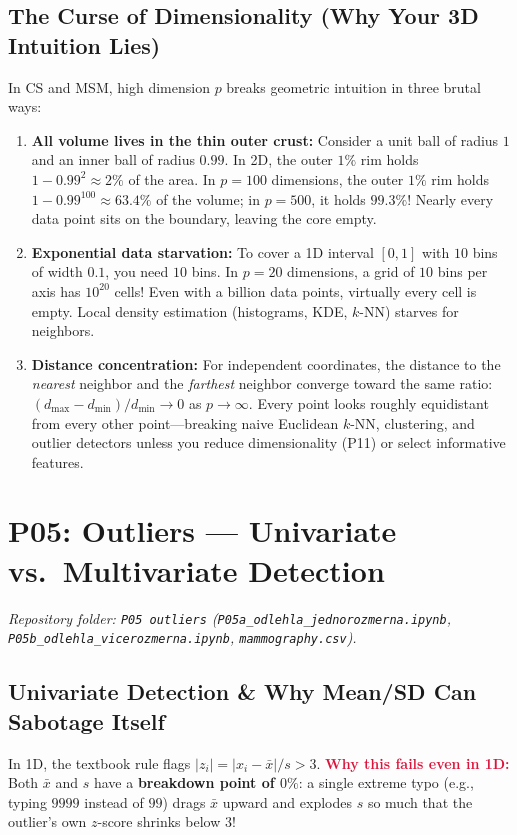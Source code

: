 \documentclass[11pt, a4paper]{article}
\begin{document}
\subsection{The Curse of Dimensionality (Why Your 3D Intuition Lies)}
In CS and MSM, high dimension $p$ breaks geometric intuition in three brutal ways:
\begin{enumerate}
    \item \textbf{All volume lives in the thin outer crust:} Consider a unit ball of radius $1$ and an inner ball of radius $0.99$. In 2D, the outer $1\%$ rim holds $1 - 0.99^2 \approx 2\%$ of the area. In $p = 100$ dimensions, the outer $1\%$ rim holds $1 - 0.99^{100} \approx 63.4\%$ of the volume; in $p = 500$, it holds $99.3\%$! Nearly every data point sits on the boundary, leaving the core empty.
    \item \textbf{Exponential data starvation:} To cover a 1D interval $[0,1]$ with $10$ bins of width $0.1$, you need $10$ bins. In $p = 20$ dimensions, a grid of $10$ bins per axis has $10^{20}$ cells! Even with a billion data points, virtually every cell is empty. Local density estimation (histograms, KDE, $k$-NN) starves for neighbors.
    \item \textbf{Distance concentration:} For independent coordinates, the distance to the \emph{nearest} neighbor and the \emph{farthest} neighbor converge toward the same ratio: $(d_{\max} - d_{\min})/d_{\min} \to 0$ as $p \to \infty$. Every point looks roughly equidistant from every other point---breaking naive Euclidean $k$-NN, clustering, and outlier detectors unless you reduce dimensionality (P11) or select informative features.
\end{enumerate}

\section{P05: Outliers --- Univariate vs.\ Multivariate Detection}
\emph{Repository folder: \texttt{P05 outliers} (\texttt{P05a\_odlehla\_jednorozmerna.ipynb}, \texttt{P05b\_odlehla\_vicerozmerna.ipynb}, \texttt{mammography.csv}).}

\subsection{Univariate Detection \& Why Mean/SD Can Sabotage Itself}
In 1D, the textbook rule flags $|z_i| = |x_i - \bar{x}|/s > 3$. \textcolor{crimson}{\textbf{Why this fails even in 1D:}} Both $\bar{x}$ and $s$ have a \textbf{breakdown point of $0\%$}: a single extreme typo (e.g., typing $9999$ instead of $99$) drags $\bar{x}$ upward and explodes $s$ so much that the outlier's own $z$-score shrinks below $3$!
\end{document}

